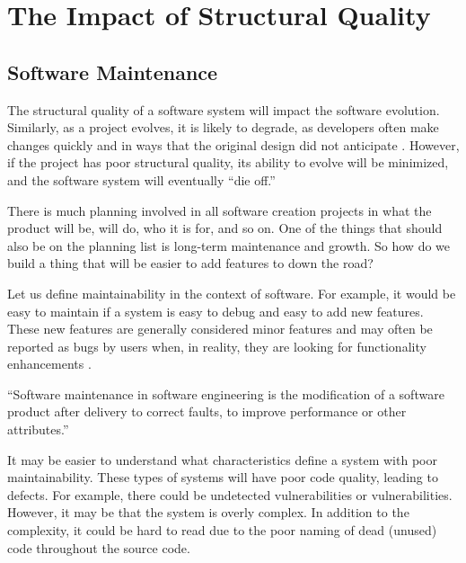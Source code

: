 
\section{The Impact of Structural Quality} \label{sectionMyIdea}

\subsection{Software Maintenance} \label{subSoftwareMaintenance}

The structural quality of a software system will impact the software evolution. Similarly, as a project evolves, it is likely to degrade, as developers often make changes quickly and in ways that the original design did not anticipate \cite{martin:2000}. However, if the project has poor structural quality, its ability to evolve will be minimized, and the software system will eventually ``die off.''

There is much planning involved in all software creation projects in what the product will be, will do, who it is for, and so on. One of the things that should also be on the planning list is long-term maintenance and growth. So how do we build a thing that will be easier to add features to down the road?

Let us define maintainability in the context of software. For example, it would be easy to maintain if a system is easy to debug and easy to add new features. These new features are generally considered minor features and may often be reported as bugs by users when, in reality, they are looking for functionality enhancements \cite{wiki:software-maintenance}.

\vspace{0.25cm}
\begin{displayquote}
  ``Software maintenance in software engineering is the modification of a software product after delivery to correct faults, to improve performance or other attributes.'' \cite{wiki:software-maintenance}
\end{displayquote}
\vspace{0.25cm}

It may be easier to understand what characteristics define a system with poor maintainability. These types of systems will have poor code quality, leading to defects. For example, there could be undetected vulnerabilities or vulnerabilities. However, it may be that the system is overly complex. In addition to the complexity, it could be hard to read due to the poor naming of dead (unused) code throughout the source code.

